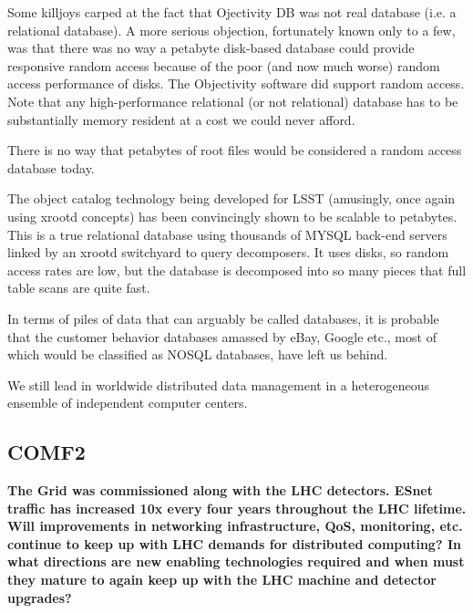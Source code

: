 Some killjoys carped at the fact that Ojectivity DB was not real database
(i.e. a relational database).  A more serious objection, fortunately known
only to a few, was that there was no way a petabyte disk-based database
could provide responsive random access because of the poor (and now much
worse) random access performance of disks.  The Objectivity software did
support random access.  Note that any high-performance relational (or not
relational) database has to be substantially memory resident at a cost we
could never afford.

There is no way that petabytes of root files would be considered a random
access database today.

The object catalog technology being developed for LSST (amusingly, once
again using xrootd concepts) has been convincingly shown to be scalable to
petabytes.  This is a true relational database using thousands of MYSQL
back-end servers linked by an xrootd switchyard to query decomposers.  It
uses disks, so random access rates are low, but the database is decomposed
into so many pieces that full table scans are quite fast.

In terms of piles of data that can arguably be called databases, it is
probable that the customer behavior databases amassed by eBay, Google
etc., most of which would be classified as NOSQL databases, have left us
behind.

We still lead in worldwide distributed data management in a heterogeneous
ensemble of independent computer centers.


\subsection{COMF2}

{\bf
The Grid was commissioned along with the LHC detectors. ESnet traffic has
increased 10x every four years throughout the LHC lifetime. Will improvements in
networking infrastructure, QoS, monitoring, etc. continue to keep up with LHC 
demands for distributed computing? In what directions are new enabling technologies
required and when must they mature to again keep up with the LHC machine and
detector upgrades? }


